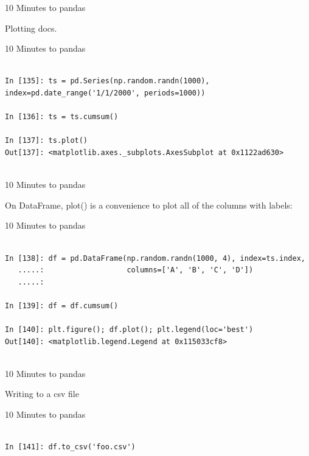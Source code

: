\documentclass{beamer}
\begin{document}
\begin{frame}[t]{10 Minutes to pandas}

Plotting docs.

\end{frame}


\begin{frame}[t,fragile]{10 Minutes to pandas}


	\scriptsize
\begin{verbatim}

In [135]: ts = pd.Series(np.random.randn(1000), index=pd.date_range('1/1/2000', periods=1000))

In [136]: ts = ts.cumsum()

In [137]: ts.plot()
Out[137]: <matplotlib.axes._subplots.AxesSubplot at 0x1122ad630>


\end{verbatim}


\end{frame}


\begin{frame}[t]{10 Minutes to pandas}

On DataFrame, plot() is a convenience to plot all of the
columns with labels:

\end{frame}


\begin{frame}[t,fragile]{10 Minutes to pandas}


	\scriptsize
\begin{verbatim}

In [138]: df = pd.DataFrame(np.random.randn(1000, 4), index=ts.index,
   .....:                   columns=['A', 'B', 'C', 'D'])
   .....: 

In [139]: df = df.cumsum()

In [140]: plt.figure(); df.plot(); plt.legend(loc='best')
Out[140]: <matplotlib.legend.Legend at 0x115033cf8>


\end{verbatim}


\end{frame}


\begin{frame}[t]{10 Minutes to pandas}

Writing to a csv file

\end{frame}


\begin{frame}[t,fragile]{10 Minutes to pandas}


	\scriptsize
\begin{verbatim}

In [141]: df.to_csv('foo.csv')


\end{verbatim}


\end{frame}
\end{document}
